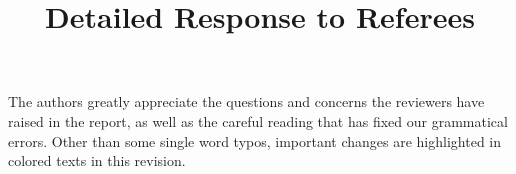 \documentclass[10pt]{amsart}
\theoremstyle{definition}
\theoremstyle{remark}
\begin{document}
\title{\large Detailed Response to Referees}%

\date{}%

\maketitle

The authors greatly appreciate the questions and concerns the reviewers have raised in the report, as well as the careful reading that has fixed our grammatical errors. Other than some single word typos, important changes are highlighted in colored texts in this revision. 






\tableofcontents


\vskip0.5cm
\end{document}
